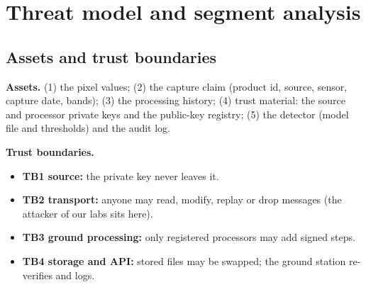 \section{Threat model and segment analysis}\label{sec:threat}

\subsection{Assets and trust boundaries}
\textbf{Assets.} (1) the pixel values; (2) the capture claim (product id, source, sensor, capture date, bands); (3) the processing history; (4) trust material: the source and processor private keys and the public-key registry; (5) the detector (model file and thresholds) and the audit log.

\textbf{Trust boundaries.}
\begin{itemize}
  \item \textbf{TB1 source:} the private key never leaves it.
  \item \textbf{TB2 transport:} anyone may read, modify, replay or drop messages (the attacker of our labs sits here).
  \item \textbf{TB3 ground processing:} only registered processors may add signed steps.
  \item \textbf{TB4 storage and API:} stored files may be swapped; the ground station re-verifies and logs.
\end{itemize}

